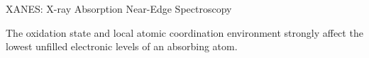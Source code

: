 \begin{slide}{XANES:  X-ray Absorption Near-Edge Spectroscopy}
\begin{cenpage}{150mm}
  \vmm
  
    The oxidation state and local atomic coordination environment strongly
    affect the lowest unfilled electronic levels of an absorbing atom.

    \vmm
    \begin{center}
      
    \begin{postitbox}{105mm}
        {}
    \end{postitbox}
  \end{center}

  \end{cenpage}

\vfill
\end{slide}

